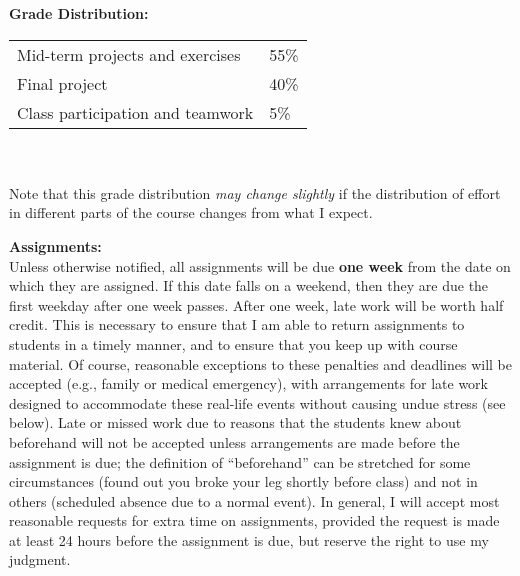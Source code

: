 \documentclass[11pt]{article}
\begin{document}
\begin{comment}
\textbf {\large Course Objectives:} \\
At the completion of this course, students will be able to:
\begin{enumerate} \itemsep-0.4em
  \item O
  \item B
  \item J
  \item E
  \item C
  \item T
  \item I
  \item V
  \item E
  \item S
\end{enumerate}
\end{comment}

\noindent\textbf {\large Grade Distribution:} \\
\hspace*{40mm}
\begin{tabular}{ l l }
Mid-term projects and exercises & 55\% \\
Final project & 40\% \\
Class participation and teamwork & 5\%
\end{tabular} \\\\
Note that this grade distribution \emph{may change slightly} if the distribution of effort in different parts of the course changes from what I expect.

\noindent\textbf{\large Assignments:}\\
Unless otherwise notified, all assignments will be due \textbf{one week} from the date on which they are assigned. If this date falls on a weekend, then they are due the first weekday after one week passes. After one week, late work will be worth half credit. This is necessary to ensure that I am able to return assignments to students in a timely manner, and to ensure that you keep up with course material. Of course, reasonable exceptions to these penalties and deadlines will be accepted (e.g., family or medical emergency), with arrangements for late work designed to accommodate these real-life events without causing undue stress (see below). Late or missed work due to reasons that the students knew about beforehand will not be accepted unless arrangements are made before the assignment is due; the definition of ``beforehand'' can be stretched for some circumstances (found out you broke your leg shortly before class) and not in others (scheduled absence due to a normal event). In general, I will accept most reasonable requests for extra time on assignments, provided the request is made at least 24 hours before the assignment is due, but reserve the right to use my judgment.
\end{document}
